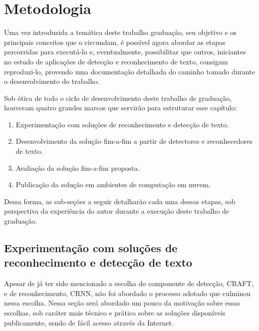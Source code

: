 \chapter{Metodologia}\label{cap:metodologia}

Uma vez introduzida a temática deste trabalho graduação, seu objetivo e os principais conceitos que o circundam, é possível agora abordar as etapas 
percorridas para executá-lo e, eventualmente, possibilitar que outros, iniciantes no estudo de aplicações de detecção e reconhecimento de texto, 
consigam reproduzi-lo, provendo uma documentação detalhada do caminho tomado durante o desenvolvimento do trabalho.

Sob ótica de todo o ciclo de desenvolvimento deste trabalho de graduação, houveram quatro grandes marcos que servirão para estruturar esse capítulo:

\begin{enumerate}
    \item Experimentação com soluções de reconhecimento e detecção de texto.
    \item Desenvolvimento da solução fim-a-fim a partir de detectores e reconhecedores de texto.
    \item Avaliação da solução fim-a-fim proposta.
    \item Publicação da solução em ambientes de computação em nuvem.
\end{enumerate}


Dessa forma, as sub-seções a seguir detalharão cada uma dessas etapas, sob perspectiva da experiência do autor durante a execução deste 
trabalho de graduação.

\section{Experimentação com soluções de reconhecimento e detecção de texto}\label{sec:metodologia_experimentacao}

Apesar de já ter sido mencionado a escolha do componente de detecção, CRAFT, e de reconhecimento, CRNN, não foi abordado o processo adotado 
que culminou nessa escolha. Nessa seção será abordado um pouco da motivação sobre essas escolhas, sob caráter mais técnico e prático sobre 
as soluções disponíveis publicamente, sendo de fácil acesso através da Internet. 

